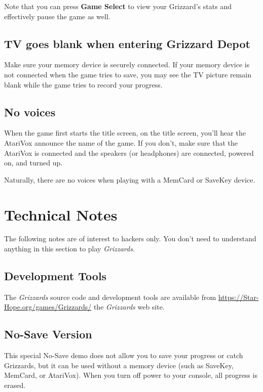 \documentclass[10pt,twocolumn,openany,article]{memoir}
\begin{document}
\begin{description}
Note that  you can  press \textbf{Game Select}  to view  your Grizzard's
stats and effectively pause the game as well.

\ifdefined\NOSAVE\else

\section{TV goes blank when entering Grizzard Depot}

Make  sure your  memory device  is  securely connected.  If your  memory
device is not connected when the game  tries to save, you may see the TV
picture remain blank while the game tries to record your progress.

\section{No voices}

When the game first starts the title screen, on the title screen, you'll
hear the AtariVox announce the name of the game. If you don't, make sure
that  the AtariVox  is connected  and the  speakers (or  headphones) are
connected, powered on, and turned up.

Naturally,  there  are  no  voices   when  playing  with  a  MemCard  or
SaveKey device.

\fi

\chapter{Technical Notes}

The following notes are of interest to hackers only. You don't need to
understand anything in this section to play \textit{Grizzards}.

\section{Development Tools}

The \textit{Grizzards} source code and development tools are available from
\href{https://Star-Hope.org/games/Grizzards/}{https://Star-Hope\-.org/\-games/\-Grizzards/} 
the \textit{Grizzards} web site.

\ifdefined\NOSAVE

\section{No-Save Version}

This special  No-Save demo does not  allow you to save  your progress or
catch Grizzards,  but it can  be used without  a memory device  (such as
SaveKey, MemCard, or AtariVox). When you turn off power to your console,
all progress is erased.


\end{description}
\end{document}
